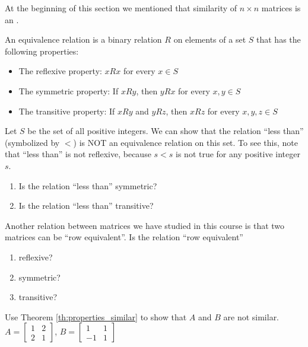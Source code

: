 \documentclass{ximera}
\begin{document}
\begin{problem}\label{prob:lessthan}
At the beginning of this section we mentioned that similarity of $n \times n$ matrices is an .

An equivalence relation is a binary relation $R$ on elements of a set $S$ that has the following properties:
\begin{itemize}
\item The reflexive property:  $x R x$ for every $x \in S$
\item The symmetric property:  If $x R y$, then $y R x$ for every $x,y \in S$
\item The transitive property:  If $x R y$ and $y R z$, then $x R z$ for every $x,y,z \in S$
\end{itemize}

Let $S$ be the set of all positive integers.  We can show that the relation ``less than'' (symbolized by $<$) is NOT an equivalence relation on this set.  To see this, note that ``less than'' is not reflexive, because $s<s$ is not true for any positive integer $s$.

\begin{enumerate}
\item
Is the relation ``less than'' symmetric? 
\item
Is the relation ``less than'' transitive? 
\end{enumerate}
\end{problem}

\begin{problem}\label{prob:lessthan3}
Another relation between matrices we have studied in this course is that two matrices can be ``row equivalent''.  Is the relation ``row equivalent'' 
\begin{enumerate}
    \item reflexive? 
    \item symmetric? 
    \item transitive? 
\end{enumerate}

\end{problem}



\begin{problem}\label{prob:notsimilar_a}

  Use Theorem \ref{th:properties_similar} to show that $A$ and $B$ are not similar.
$A = \begin{bmatrix}
	1 & 2 \\
	2 & 1
\end{bmatrix}$, $B =
\begin{bmatrix}
	1 & 1\\
	-1 & 1
\end{bmatrix}$

\end{problem}
\end{document}

